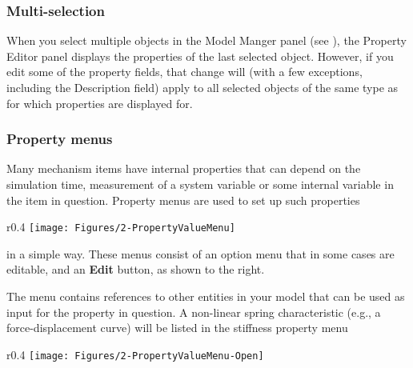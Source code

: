 
\subsubsection{Multi-selection}

When you select multiple objects in the Model Manger panel
(see ),
the Property Editor panel displays the properties of the last selected object.
However, if you edit some of the property fields, that change will
(with a few exceptions, including the Description field) apply to all selected
objects of the same type as for which properties are displayed for.


\subsubsection{Property menus}

Many mechanism items have internal properties that can depend on the simulation
time, measurement of a system variable or some internal variable in the item in
question. Property menus are used to set up such properties

\begin{wrapfigure}[2]{r}{0.4\textwidth} \vskip-2mm
  \texttt{[image: Figures/2-PropertyValueMenu]}
\end{wrapfigure}

\vskip-1mm\noindent in a simple way.
These menus consist of an option menu that in some cases are editable,
and an \textbf{Edit} button, as shown to the right.

The menu contains references to other entities in your model
that can be used as input for the property in question.
A non-linear spring characteristic (e.g., a force-displacement curve) will be
listed in the stiffness property menu

\begin{wrapfigure}[4]{r}{0.4\textwidth} \vskip-2mm
  \texttt{[image: Figures/2-PropertyValueMenu-Open]}
\end{wrapfigure}

